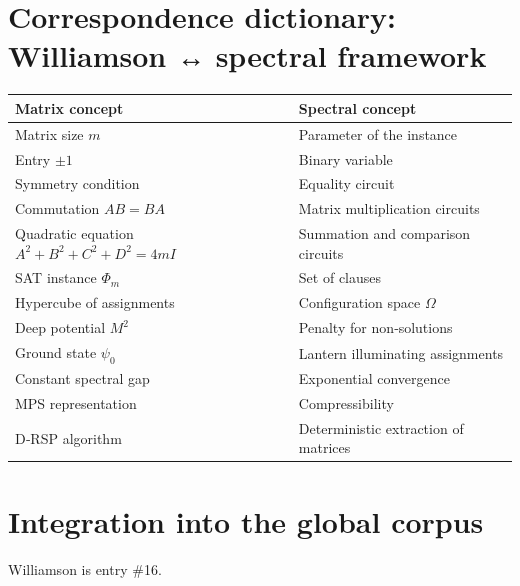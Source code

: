 \documentclass[11pt,a4paper]{article}
\begin{document}
\section{Correspondence dictionary: Williamson ↔ spectral framework}

\begin{center}
\small
\begin{tabular}{@{}l|l@{}}
\toprule
\textbf{Matrix concept} & \textbf{Spectral concept} \\
\midrule
Matrix size $m$ & Parameter of the instance \\
Entry $\pm1$ & Binary variable \\
Symmetry condition & Equality circuit \\
Commutation $AB=BA$ & Matrix multiplication circuits \\
Quadratic equation $A^2+B^2+C^2+D^2=4mI$ & Summation and comparison circuits \\
SAT instance $\Phi_m$ & Set of clauses \\
Hypercube of assignments & Configuration space $\Omega$ \\
Deep potential $M^2$ & Penalty for non‑solutions \\
Ground state $\psi_0$ & Lantern illuminating assignments \\
Constant spectral gap & Exponential convergence \\
MPS representation & Compressibility \\
D‑RSP algorithm & Deterministic extraction of matrices \\
\bottomrule
\end{tabular}
\end{center}

\section{Integration into the global corpus}

Williamson is entry \#16.
\end{document}
